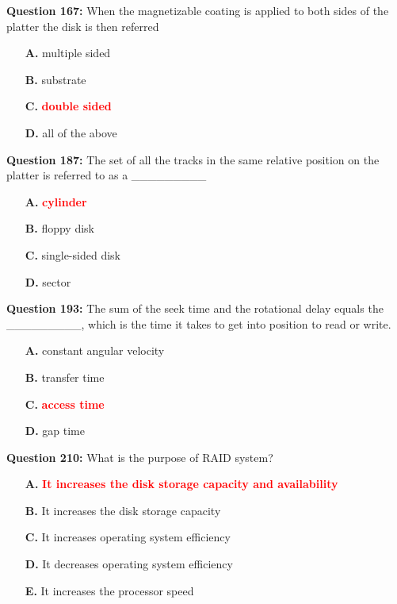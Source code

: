 \documentclass[12pt,a4paper]{article}
\begin{document}
\vspace{0.5cm}

\textbf{Question 167:} When the magnetizable coating is applied to both sides of the platter the disk is then referred

\begin{itemize}
    \item[\textbf{A.}] multiple sided
    \item[\textbf{B.}] substrate
    \item[\textbf{C.}] \textcolor{red}{\textbf{double sided}}
    \item[\textbf{D.}] all of the above
\end{itemize}

\vspace{0.5cm}

\textbf{Question 187:} The set of all the tracks in the same relative position on the platter is referred to as a _________

\begin{itemize}
    \item[\textbf{A.}] \textcolor{red}{\textbf{cylinder}}
    \item[\textbf{B.}] floppy disk
    \item[\textbf{C.}] single-sided disk
    \item[\textbf{D.}] sector
\end{itemize}

\vspace{0.5cm}

\textbf{Question 193:} The sum of the seek time and the rotational delay equals the _________, which is the time it takes to get into position to read or write.

\begin{itemize}
    \item[\textbf{A.}] constant angular velocity
    \item[\textbf{B.}] transfer time
    \item[\textbf{C.}] \textcolor{red}{\textbf{access time}}
    \item[\textbf{D.}] gap time
\end{itemize}

\vspace{0.5cm}

\textbf{Question 210:} What is the purpose of RAID system?

\begin{itemize}
    \item[\textbf{A.}] \textcolor{red}{\textbf{It increases the disk storage capacity and availability}}
    \item[\textbf{B.}] It increases the disk storage capacity
    \item[\textbf{C.}] It increases operating system efficiency
    \item[\textbf{D.}] It decreases operating system efficiency
    \item[\textbf{E.}] It increases the processor speed
\end{itemize}
\end{document}

